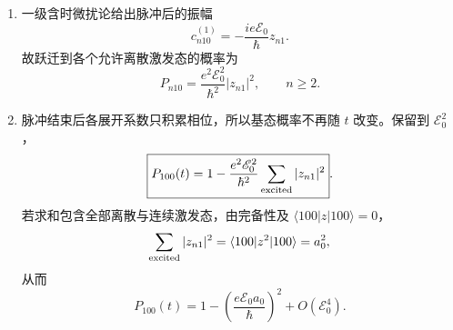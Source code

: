 \begin{enumerate}
{\begin{enumerate}
		\item 一级含时微扰论给出脉冲后的振幅
		\[
			c_{n10}^{(1)}=-\frac{i e\mathscr E_0}{\hbar}z_{n1}.
		\]
		故跃迁到各个允许离散激发态的概率为
		\[
			\boxed{P_{n10}=\frac{e^2\mathscr E_0^2}{\hbar^2}|z_{n1}|^2,
			\qquad n\ge2}.
		\]

		\item 脉冲结束后各展开系数只积累相位，所以基态概率不再随 $t$ 改变。保留到
		$\mathscr E_0^2$，
		\[
			\boxed{P_{100}(t)=1-\frac{e^2\mathscr E_0^2}{\hbar^2}
			\sum_{\rm excited}|z_{n1}|^2}.
		\]
		若求和包含全部离散与连续激发态，由完备性及
		$\langle100|z|100\rangle=0$，
		\[
			\sum_{\rm excited}|z_{n1}|^2
			=\langle100|z^2|100\rangle=a_0^2,
		\]
		从而
		\[
			\boxed{P_{100}(t)=1-\left(\frac{e\mathscr E_0a_0}{\hbar}\right)^2
			+O(\mathscr E_0^4)}.
		\]
	\end{enumerate}
}


	
\end{enumerate}
